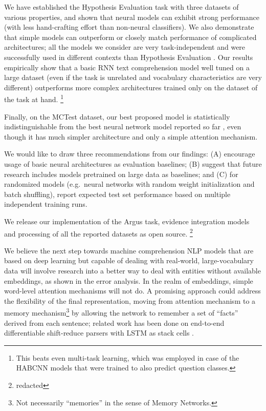 \documentclass[11pt]{article}
\begin{document}
We have established the Hypothesis Evaluation task with three datasets
of various properties, and shown that neural models can exhibit strong
performance (with less hand-crafting effort than non-neural classifiers).
We also demonstrate that simple models can outperform or closely match
performance of complicated architectures;
all the models we consider are very task-independent and were successfully
used in different contexts than Hypothesis Evaluation \cite{sps}.
Our results empirically show that a basic RNN text comprehension model
well tuned on a large dataset (even if the task is unrelated and vocabulary
characteristics are very different) outperforms more complex architectures
trained only on the dataset of the task at hand.%
\footnote{This beats even multi-task learning, which was employed in case
of the HABCNN models that were trained to also predict question classes.}

Finally, on the MCTest dataset, our best proposed model is statistically
indistinguishable from the best neural network model reported so far
\cite{HABCNN},
even though it has much simpler architecture and only a simple attention
mechanism.

We would like to draw three recommendations from our findings:
(A) encourage usage of basic neural architectures as evaluation baselines;
(B) suggest that future research includes models pretrained on large data as
baselines; and
(C) for randomized models (e.g.\ neural networks with random weight
initialization and batch shuffling), report expected test set performance
based on multiple independent training runs.

We release our implementation of the Argus task, evidence integration
models and processing of all the reported datasets as open source.%
\footnote{redacted}

We believe the next step towards machine comprehension NLP models
that are based on deep learning but capable of dealing with real-world,
large-vocabulary data will involve research into a better way to deal with
entities without available embeddings, as shown in the error analysis.
In the realm of embeddings, simple word-level attention mechanisms will not do.
A promising approach could address
the flexibility of the final representation, moving from attention mechanism
to a memory mechanism\footnote{Not necessarily ``memories'' in the sense of Memory Networks.}
by allowing the network to remember a set of ``facts'' derived from each sentence;
related work has been done on end-to-end differentiable shift-reduce parsers
with LSTM as stack cells \cite{EndToEndParsing}.
\end{document}

